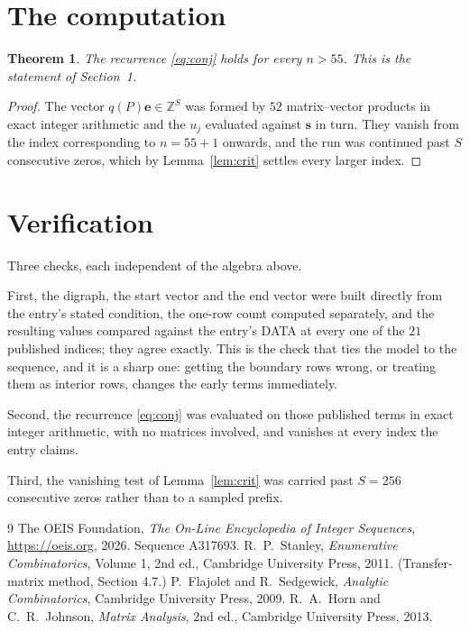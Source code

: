 \documentclass[11pt,a4paper]{article}
\theoremstyle{plain}
\newtheorem{theorem}{Theorem}
\theoremstyle{definition}
\begin{document}
\section{The computation}

\begin{theorem}
The recurrence \eqref{eq:conj} holds for every $n>55$. This is the statement of
Section~1.
\end{theorem}

\begin{proof}
The vector $q(P)\mathbf{e}\in\mathbb{Z}^{S}$ was formed by $52$ matrix--vector
products in exact integer arithmetic and the $u_j$ evaluated against $\mathbf{s}$ in turn.
They vanish from the index corresponding to $n=55+1$ onwards, and the run was continued
past $S$ consecutive zeros, which by Lemma~\ref{lem:crit} settles every larger index.
\end{proof}

\section{Verification}

Three checks, each independent of the algebra above.

First, the digraph, the start vector and the end vector were built directly from the
entry's stated condition, the one-row count computed separately, and the resulting values
compared against the entry's DATA at every one of the $21$ published indices; they
agree exactly. This is the check that ties the model to the sequence, and it is a sharp one:
getting the boundary rows wrong, or treating them as interior rows, changes the early terms
immediately.

Second, the recurrence \eqref{eq:conj} was evaluated on those published terms in exact
integer arithmetic, with no matrices involved, and vanishes at every index the entry claims.

Third, the vanishing test of Lemma~\ref{lem:crit} was carried past $S=256$ consecutive
zeros rather than to a sampled prefix.

\begin{thebibliography}{9}
 The OEIS Foundation, \emph{The On-Line Encyclopedia of Integer
Sequences}, \url{https://oeis.org}, 2026. Sequence A317693.
 R.~P.~Stanley, \emph{Enumerative Combinatorics}, Volume 1, 2nd ed.,
Cambridge University Press, 2011. (Transfer-matrix method, Section 4.7.)
 P.~Flajolet and R.~Sedgewick, \emph{Analytic Combinatorics}, Cambridge
University Press, 2009.
 R.~A.~Horn and C.~R.~Johnson, \emph{Matrix Analysis}, 2nd ed., Cambridge
University Press, 2013.
\end{thebibliography}
\end{document}
